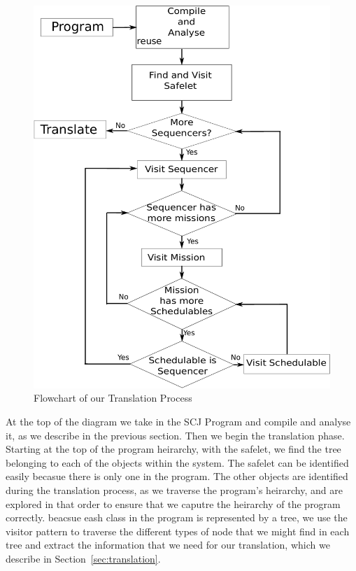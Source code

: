 \documentclass[10pt,a4paper]{article}
\begin{document}
\begin{figure}[h!]
\begin{center}
\includegraphics[scale=0.5]{translation.pdf}
\caption{Flowchart of our Translation Process \label{fig:translationFlow} }
\end{center}
\end{figure}

At the top of the diagram we take in the SCJ Program and compile and analyse it, as we describe in the previous section. Then we begin the translation phase. Starting at the top of the program heirarchy, with the safelet, we find the tree belonging to each of the objects within the system. The safelet can be identified easily becasue there is only one in the program. The other objects are identified during the translation process, as we traverse the program's heirarchy, and are explored in that order to ensure that we caputre the heirarchy of the program correctly. beacsue eash class in the program is represented by a tree, we use the visitor pattern to traverse the different types of node that we might find in each tree and extract the information that we need for our translation, which we describe in Section~\ref{sec:translation}.
\end{document}
